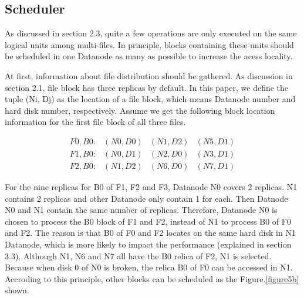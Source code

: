 \documentclass[preprint,12pt]{elsarticle}
\begin{document}
\subsection{Scheduler}
As discussed in section 2.3, quite a few operations are only executed on the same logical units among multi-files. In principle, blocks 
containing these units should be scheduled in one Datanode as many as possible to increase the acess locality. \par
At first, information about file distribution should be gathered. As discussion in section 2.1, file block has three replicas by default. 
In this paper, we define the tuple (Ni, Dj) as the location of a file block, which means Datanode number and hard disk number, respectively. 
Assume we get the following block location information for the first file block of all three files. \par

$$\begin{array} {lcrr}
F0,B0: & (N0,D0) & (N1,D2) & (N5,D1) \\
F1,B0: & (N0,D1) & (N2,D0) & (N3,D1) \\
F2,B0: & (N1,D2) & (N6,D0) & (N7,D1)
\end{array}$$

For the nine replicas for B0 of F1, F2 and F3, Datanode N0 covers 2 replicas. N1 contains 2 replicas and other Datanode only contain 1 for 
each. Then Datnode N0 and N1 contain the same number of replicas. Therefore, Datanode N0 is chosen to process the B0 block of F1 and F2,
instead of N1 to process B0 of F0 and F2. The reason is that B0 of F0 and F2 locates on the same hard disk in N1 Datanode, which is more 
likely to impact the performance (explained in section 3.3). Although N1, N6 and N7 all have the B0 relica of F2, N1 is selected. 
Because when disk 0 of N0 is broken, the relica B0 of F0 can be accessed in N1. Accroding to this principle, other blocks can be scheduled
as the Figure.\ref{figure5b} shown.
\end{document}
